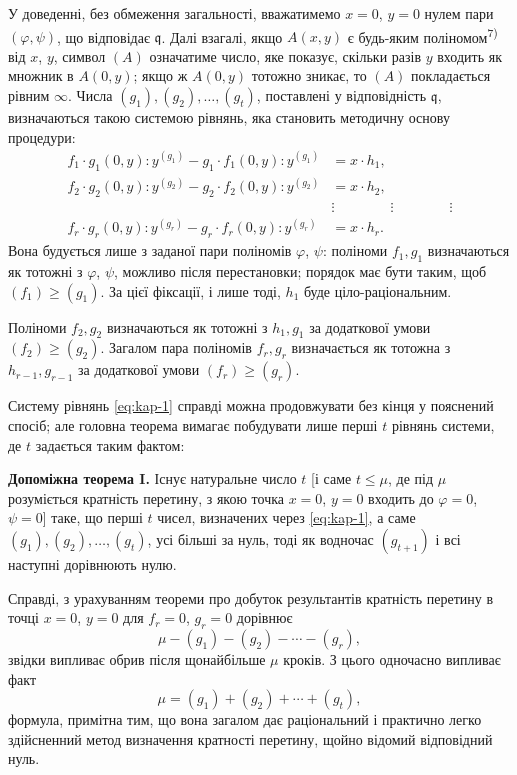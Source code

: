 \documentclass[11pt]{article}
\theoremstyle{plain}
\begin{document}
У доведенні, без обмеження загальності, вважатимемо $x = 0$,
$y = 0$ нулем пари $(\varphi, \psi)$, що відповідає
$\mathfrak{q}$. Далі взагалі, якщо $A(x,y)$ є будь-яким
поліномом\textsuperscript{7)} від $x$, $y$, символ $(A)$ означатиме
число, яке показує, скільки разів $y$ входить як множник в $A(0,y)$;
якщо ж $A(0,y)$ тотожно зникає, то $(A)$ покладається рівним
$\infty$. Числа $(g_{1}), (g_{2}), \ldots, (g_{t})$, поставлені у
відповідність $\mathfrak{q}$, визначаються такою системою рівнянь,
яка становить методичну основу процедури:
\begin{equation}\label{eq:kap-1}
\begin{aligned}
f_{1} \cdot g_{1}(0,y):y^{(g_{1})} - g_{1} \cdot f_{1}(0,y):y^{(g_{1})} &= x \cdot h_{1},\\
f_{2} \cdot g_{2}(0,y):y^{(g_{2})} - g_{2} \cdot f_{2}(0,y):y^{(g_{2})} &= x \cdot h_{2},\\
&\vdots \qquad\qquad\vdots\qquad\qquad\vdots\\
f_{r} \cdot g_{r}(0,y):y^{(g_{r})} - g_{r} \cdot f_{r}(0,y):y^{(g_{r})} &= x \cdot h_{r}.
\end{aligned}
\end{equation}
Вона будується лише з заданої пари поліномів $\varphi$, $\psi$:
поліноми $f_{1}, g_{1}$ визначаються як тотожні з $\varphi$, $\psi$,
можливо після перестановки; порядок має бути таким, щоб
$(f_{1}) \geq (g_{1})$. За цієї фіксації, і лише тоді, $h_{1}$ буде
ціло-раціональним.

Поліноми $f_{2}, g_{2}$ визначаються як тотожні з $h_{1}, g_{1}$ за
додаткової умови $(f_{2}) \geq (g_{2})$. Загалом пара поліномів
$f_{r}, g_{r}$ визначається як тотожна з $h_{r-1}, g_{r-1}$ за
додаткової умови $(f_{r}) \geq (g_{r})$.

Систему рівнянь \eqref{eq:kap-1} справді можна продовжувати без кінця
у пояснений спосіб; але головна теорема вимагає побудувати лише
перші $t$ рівнянь системи, де $t$ задається таким фактом:

\smallskip
\textbf{Допоміжна теорема I.} Існує натуральне число $t$ [і саме
$t \leq \mu$, де під $\mu$ розуміється кратність перетину, з якою
точка $x = 0$, $y = 0$ входить до $\varphi = 0$, $\psi = 0$] таке, що
перші $t$ чисел, визначених через \eqref{eq:kap-1}, а саме
$(g_{1}), (g_{2}), \ldots, (g_{t})$, усі більші за нуль, тоді як
водночас $(g_{t+1})$ і всі наступні дорівнюють нулю.

Справді, з урахуванням теореми про добуток результантів кратність
перетину в точці $x = 0$, $y = 0$ для $f_{r} = 0$, $g_{r} = 0$
дорівнює
\[
\mu - (g_{1}) - (g_{2}) - \cdots - (g_{r}),
\]
звідки випливає обрив після щонайбільше $\mu$ кроків. З цього
одночасно випливає факт
\begin{equation}\label{eq:kap-2}
\mu = (g_{1}) + (g_{2}) + \cdots + (g_{t}),
\end{equation}
формула, примітна тим, що вона загалом дає раціональний і практично
легко здійсненний метод визначення кратності перетину, щойно відомий
відповідний нуль.
\end{document}
